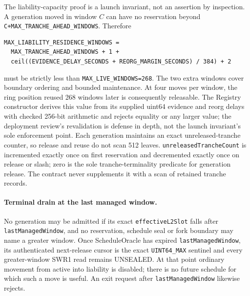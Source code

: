 \documentclass[a4paper,11pt]{article}
\newcommand{\code}[1]{\nolinkurl{#1}}
\begin{document}
The liability-capacity proof is a launch invariant, not an assertion by
inspection.  A generation moved in window $C$ can have no reservation beyond
\code{C+MAX_TRANCHE_AHEAD_WINDOWS}.  Therefore
\begin{verbatim}
MAX_LIABILITY_RESIDENCE_WINDOWS =
  MAX_TRANCHE_AHEAD_WINDOWS + 1 +
  ceil((EVIDENCE_DELAY_SECONDS + REORG_MARGIN_SECONDS) / 384) + 2
\end{verbatim}
must be strictly less than \code{MAX_LIVE_WINDOWS=268}.  The two extra windows
cover boundary ordering and bounded maintenance.  At four moves per window,
the ring position reused 268 windows later is consequently releasable.  The
Registry constructor derives this value from its supplied uint64 evidence and
reorg delays with checked 256-bit arithmetic and rejects equality or any larger
value; the deployment review's revalidation is defense in depth, not the
launch invariant's sole enforcement point.  Each
generation maintains an exact unreleased-tranche counter, so release and reuse
do not scan 512 leaves.  \code{unreleasedTrancheCount} is incremented exactly
once on first reservation and decremented exactly once on release or slash;
zero is the sole tranche-terminality predicate for generation release.  The
contract never supplements it with a scan of retained tranche records.

\paragraph{Terminal drain at the last managed window.}
No generation may be admitted if its exact \code{effectiveL2Slot} falls after
\code{lastManagedWindow}, and no reservation, schedule seal or fork boundary
may name a greater window.  Once ScheduleOracle has expired
\code{lastManagedWindow}, its authenticated next-release cursor is the exact
\code{UINT64_MAX} sentinel and every greater-window SWR1 read remains
UNSEALED.  At that point ordinary movement from active into liability is disabled;
there is no future schedule for which such a move is useful.  An exit request
after \code{lastManagedWindow} likewise rejects.
\end{document}

